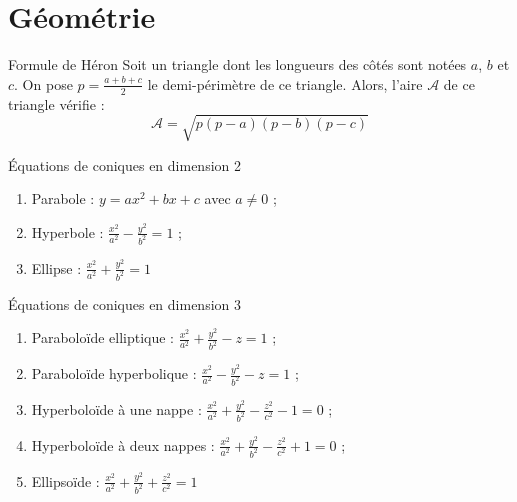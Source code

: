 \documentclass[french]{article}
\theoremstyle{definition}
\begin{document}
\section{Géométrie}

\begin{lem}{Formule de Héron}
	Soit un triangle dont les longueurs des côtés sont notées $a$, $b$ et $c$. On pose $p=\displaystyle\frac{a+b+c}{2}$ le demi-périmètre de ce triangle. Alors, l'aire $\mathcal{A}$ de ce triangle vérifie : $$\mathcal{A}=\sqrt{p(p-a)(p-b)(p-c)}$$
\end{lem}

\begin{lem}{Équations de coniques en dimension 2}
	\begin{enumerate}
		\item Parabole : $y=ax^2+bx+c$ avec $a\ne 0$ ;
		\item Hyperbole : $\displaystyle\frac{x^2}{a^2}-\frac{y^2}{b^2}=1$ ;
		\item Ellipse : $\displaystyle\frac{x^2}{a^2}+\frac{y^2}{b^2}=1$
	\end{enumerate}
\end{lem}

\begin{lem}{Équations de coniques en dimension 3}
	\begin{enumerate}
		\item Paraboloïde elliptique : $\displaystyle\frac{x^2}{a^2}+\frac{y^2}{b^2}-z=1$ ;
		\item Paraboloïde hyperbolique : $\displaystyle\frac{x^2}{a^2}-\frac{y^2}{b^2}-z=1$ ;
		\item Hyperboloïde à une nappe : $\displaystyle\frac{x^2}{a^2}+\frac{y^2}{b^2}-\frac{z^2}{c^2}-1=0$ ;
		\item Hyperboloïde à deux nappes : $\displaystyle\frac{x^2}{a^2}+\frac{y^2}{b^2}-\frac{z^2}{c^2}+1=0$ ;
		\item Ellipsoïde : $\displaystyle\frac{x^2}{a^2}+\frac{y^2}{b^2}+\frac{z^2}{c^2}=1$
	\end{enumerate}
\end{lem}
\end{document}
